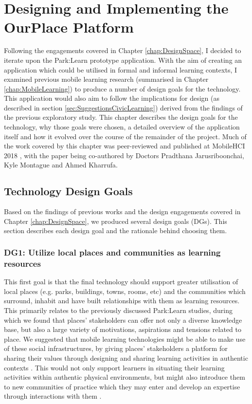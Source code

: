 \chapter{Designing and Implementing the OurPlace Platform}
\label{chap:Design}

Following the engagements covered in Chapter \ref{chap:DesignSpace}, I decided to iterate upon the Park:Learn prototype application. With the aim of creating an application which could be utilised in formal and informal learning contexts, I examined previous mobile learning research (summarised in Chapter \ref{chap:MobileLearning}) to produce a number of design goals for the technology. This application would also aim to follow the implications for design (as described in section \ref{sec:SuggestionsCivicLearning}) derived from the findings of the previous exploratory study. This chapter describes the design goals for the technology, why those goals were chosen, a detailed overview of the application itself and how it evolved over the course of the remainder of the project. Much of the work covered by this chapter was peer-reviewed and published at MobileHCI 2018 \citep{Richardson2018}, with the paper being co-authored by Doctors Pradthana Jarusriboonchai, Kyle Montague and Ahmed Kharrufa. 

\section{Technology Design Goals}

Based on the findings of previous works and the design engagements covered in Chapter \ref{chap:DesignSpace}, we produced several design goals (DGs). This section describes each design goal and the rationale behind choosing them.


\subsection*{ DG1: Utilize local places and communities as learning resources }
\label{DG1}

This first goal is that the final technology should support greater utilisation of local places (e.g. parks, buildings, towns, rooms, etc) and the communities which surround, inhabit and have built relationships with them as learning resources. This primarily relates to the previously discussed Park:Learn studies, during which we found that places' stakeholders can offer not only a diverse knowledge base, but also a large variety of motivations, aspirations and tensions related to place. We suggested that mobile learning technologies might be able to make use of these social infrastructures, by giving places’ stakeholders a platform for sharing their values through designing and sharing learning activities in authentic contexts \citep{Richardson2017}. This would not only support learners in situating their learning activities within authentic physical environments, but might also introduce them to new communities of practice which they may enter and develop an expertise through interactions with them \citep{lave1991situated}.

